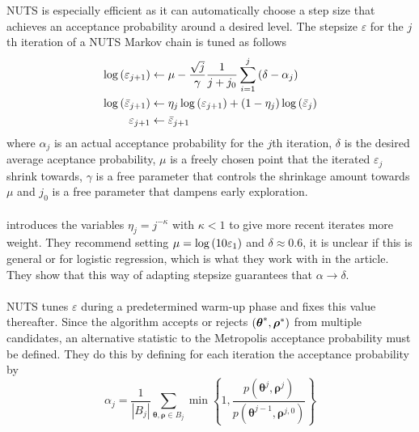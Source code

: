 \\
\\
NUTS is especially efficient as it can automatically choose a step size that achieves an acceptance probability around a desired level. The stepsize $\varepsilon$ for the $j$th iteration of a NUTS Markov chain is tuned as follows
\begin{equation*}
    \begin{split}
        \log\left (\varepsilon_{j+1}\right) &\leftarrow \mu - \frac{\sqrt{j}}{\gamma} \frac{1}{j + j_0} \sum_{i=1}^j \left (\delta - \alpha_j\right)\\
        \log \left (\bar{\varepsilon}_{j+1}\right) &\leftarrow \eta_j \log \left (\varepsilon_{j+1}\right) + \left (1 - \eta_j\right) \log \left (\bar{\varepsilon}_j\right) \\
        \varepsilon_{j+1} &\leftarrow \bar{\varepsilon}_{j+1}
    \end{split}
\end{equation*}
where $\alpha_j$ is an actual acceptance probability for the $j$th iteration, $\delta$ is the desired average aceptance probability, $\mu$ is a freely chosen point that the iterated $\varepsilon_j$ shrink towards, $\gamma$ is a free parameter that controls the shrinkage amount towards $\mu$ and $j_0$ is a free parameter that dampens early exploration. 
\\
\\
\cite{hoffman2011nouturn} introduces the variables $\eta_j = j^{-\kappa}$ with $\kappa < 1$ to give more recent iterates more weight. They recommend setting $\mu = \log \left (10 \varepsilon_1\right)$ and $\delta \approx 0.6$, it is unclear if this is general or for logistic regression, which is what they work with in the article. They show that this way of adapting stepsize guarantees that $\alpha \rightarrow \delta$.
\\
\\
NUTS tunes $\varepsilon$ during a predetermined warm-up phase and fixes this value thereafter. Since the algorithm accepts or rejects $\left (\boldsymbol{\theta}^*, \boldsymbol{\rho}^*\right)$ from multiple candidates, an alternative statistic to the Metropolis acceptance probability must be defined. They do this by defining for each iteration the acceptance probability by
\begin{equation*}
    \alpha_{j}=\frac{1}{\left|B_{j}\right|} \sum_{\boldsymbol{\theta}, \boldsymbol{\rho} \in B_{j}} \min \left\{1, \frac{p\left(\boldsymbol{\theta}^{j}, \boldsymbol{\rho}^{j}\right)}{p\left(\boldsymbol{\theta}^{j-1}, \boldsymbol{\rho}^{j, 0}\right)}\right\}
\end{equation*}

